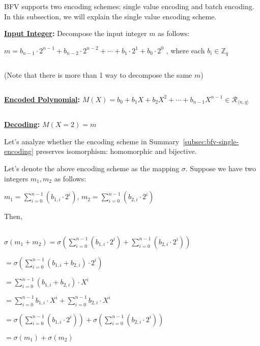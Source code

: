 BFV supports two encoding schemes: single value encoding and batch encoding. In this subsection, we will explain the single value encoding scheme. 



\begin{tcolorbox}[title={\textbf{\tboxlabel{\ref*{subsec:bfv-single-encoding}} BFV Encoding}}]

\textbf{\underline{Input Integer}:} Decompose the input integer $m$ as follows:

$m = b_{n-1}\cdot 2^{n-1} + b_{n-2}\cdot 2^{n-2} + \cdots + b_1\cdot 2^1 + b_0\cdot 2^0$  \text { } , where each $b_i \in \mathbb{Z}_q$

$ $

(Note that there is more than 1 way to decompose the same $m$)

$ $

\textbf{\underline{Encoded Polynomial}:} $M(X) = b_0 + b_1X + b_2X^2 + \cdots + b_{n-1}X^{n-1} \in \mathcal{R}_{\langle n, q\rangle}$

$ $

\textbf{\underline{Decoding}:} $M(X=2) = m$

\end{tcolorbox}


Let's analyze whether the encoding scheme in Summary~\ref*{subsec:bfv-single-encoding} preserves isomorphism: homomorphic and bijective. 


 Let's denote the above encoding scheme as the mapping $\sigma$. Suppose we have two integers $m_1, m_2$ as follows:

$m_1 = \sum\limits_{i=0}^{n-1}(b_{1, i} \cdot 2^i)$, \text{ } $m_2 = \sum\limits_{i=0}^{n-1}(b_{2, i} \cdot 2^i)$

Then,

$ $

$\sigma (m_1 + m_2) = \sigma\left(\sum\limits_{i=0}^{n-1}(b_{1, i} \cdot 2^i) + \sum\limits_{i=0}^{n-1}(b_{2,i} \cdot 2^i)\right)$

$= \sigma\left(\sum\limits_{i=0}^{n-1}(b_{1,i} + b_{2,i})\cdot 2^i\right)$

$= \sum\limits_{i=0}^{n-1} (b_{1,i} + b_{2,i})\cdot X^i$

$= \sum\limits_{i=0}^{n-1} b_{1,i}\cdot X^i + \sum\limits_{i=0}^{n-1} b_{2,i}\cdot X^i$

$= \sigma\left( \sum\limits_{i=0}^{n-1} (b_{1,i} \cdot 2^i)\right) + \sigma\left( \sum\limits_{i=0}^{n-1} (b_{2,i} \cdot 2^i) \right)$

$= \sigma(m_1) + \sigma(m_2)$

